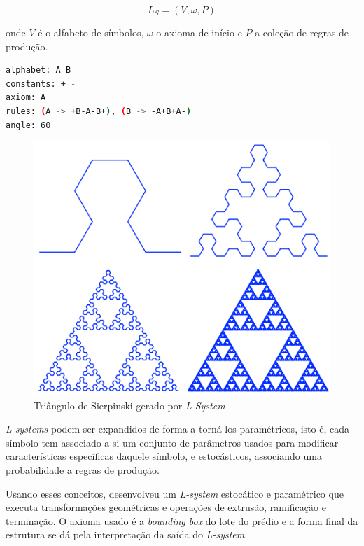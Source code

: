 \documentclass[a4paper, 11pt]{article}
\begin{document}
    $$ L_S = (V, \omega, P) $$

    onde $V$ é o alfabeto de símbolos, $\omega$ o axioma de início e $P$ a coleção de regras de produção. 

    \begin{center}
        \begin{lstlisting}[language=sh,caption=Triângulo de Sierpinski, frame=single, basicstyle=\ttfamily\small, captionpos=b]
alphabet: A B
constants: + -
axiom: A
rules: (A -> +B-A-B+), (B -> -A+B+A-)
angle: 60
        \end{lstlisting}
        \label{lst:sierpinski}
    \end{center}

    \begin{figure}[h]
        \centering
        \includegraphics[width=\textwidth]{imgs/sierpinski.png}
        \caption{Triângulo de Sierpinski gerado por \textit{L-System}}
        \label{fig:sierpinski}
    \end{figure}

    \textit{L-systems} podem ser expandidos de forma a torná-los paramétricos, isto é, cada símbolo tem associado a si um conjunto de parâmetros usados para modificar características específicas daquele símbolo, e estocásticos, associando uma probabilidade a regras de produção. 

    Usando esses conceitos, \cite{Parish:2001:PMC:383259.383292} desenvolveu um \textit{L-system} estocático e paramétrico que executa transformações geométricas e operações de extrusão, ramificação e terminação. O axioma usado é a \textit{bounding box} do lote do prédio e a forma final da estrutura se dá pela interpretação da saída do \textit{L-system}.
\end{document}
